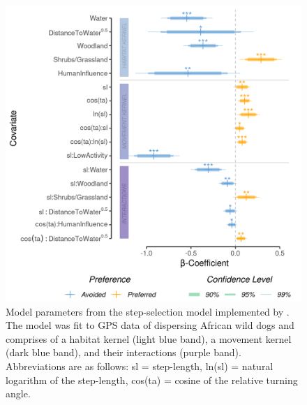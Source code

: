 \documentclass[../FinalThesis.tex]{subfiles}
\begin{document}
\begin{figure}[!ht]
  \begin{center}
  \includegraphics[width = \textwidth]{Figures/MovementModel.png}
  \caption{Model parameters from the step-selection model implemented by
  \citet{Hofmann.2023}. The model was fit to GPS data of dispersing African wild
  dogs and comprises of a habitat kernel (light blue band), a movement kernel
  (dark blue band), and their interactions (purple band). Abbreviations are as
  follows: sl = step-length, ln(sl) = natural logarithm of the step-length,
  cos(ta) = cosine of the relative turning angle.}
  \label{Model}
  \end{center}
\end{figure}

\newpage
\end{document}
